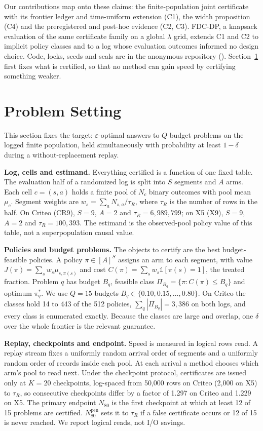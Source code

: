 \documentclass[sigconf,anonymous,review]{acmart}
\newcommand{\eps}{\varepsilon}
\newcommand{\Npen}{N_{80}^{\text{pen}}}
\begin{document}
\noindent Our contributions map onto these claims: the finite-population joint certificate with its frontier ledger and time-uniform extension (C1), the width proposition (C4) and the preregistered and post-hoc evidence (C2, C3). FDC-DP, a knapsack evaluation of the same certificate family on a global $\lambda$ grid, extends C1 and C2 to implicit policy classes and to a log whose evaluation outcomes informed no design choice. Code, locks, seeds and seals are in the anonymous repository (\anonrepo). Section~\ref{sec:setting} first fixes what is certified, so that no method can gain speed by certifying something weaker.

\section{Problem Setting}\label{sec:setting}

This section fixes the target: $\eps$-optimal answers to $Q$ budget problems on the logged finite population, held simultaneously with probability at least $1-\delta$ during a without-replacement replay.

\textbf{Log, cells and estimand.} Everything certified is a function of one fixed table. The evaluation half of a randomized log is split into $S$ segments and $A$ arms. Each cell $c = (s,a)$ holds a finite pool of $N_c$ binary outcomes with pool mean $\mu_c$. Segment weights are $w_s = \sum_a N_{s,a}/\tau_R$, where $\tau_R$ is the number of rows in the half. On Criteo (CR9), $S = 9$, $A = 2$ and $\tau_R = 6{,}989{,}799$; on X5 (X9), $S = 9$, $A = 2$ and $\tau_R = 100{,}393$. The estimand is the observed-pool policy value of this table, not a superpopulation causal value.

\textbf{Policies and budget problems.} The objects to certify are the best budget-feasible policies. A policy $\pi \in [A]^S$ assigns an arm to each segment, with value $J(\pi) = \sum_s w_s \mu_{s,\pi(s)}$ and cost $C(\pi) = \sum_s w_s \mathbb{1}[\pi(s) = 1]$, the treated fraction. Problem $q$ has budget $B_q$, feasible class $\Pi_{B_q} = \{\pi : C(\pi) \le B_q\}$ and optimum $\pi^*_q$. We use $Q = 15$ budgets $B_q \in \{0.10, 0.15, \dots, 0.80\}$. On Criteo the classes hold 14 to 443 of the 512 policies, $\sum_q |\Pi_{B_q}| = 3{,}386$ on both logs, and every class is enumerated exactly. Because the classes are large and overlap, one $\delta$ over the whole frontier is the relevant guarantee.

\textbf{Replay, checkpoints and endpoint.} Speed is measured in logical rows read. A replay stream fixes a uniformly random arrival order of segments and a uniformly random order of records inside each pool. At each arrival a method chooses which arm's pool to read next. Under the checkpoint protocol, certificates are issued only at $K = 20$ checkpoints, log-spaced from 50,000 rows on Criteo (2,000 on X5) to $\tau_R$, so consecutive checkpoints differ by a factor of 1.297 on Criteo and 1.229 on X5. The primary endpoint $N_{80}$ is the first checkpoint at which at least 12 of 15 problems are certified. $\Npen$ sets it to $\tau_R$ if a false certificate occurs or 12 of 15 is never reached. We report logical reads, not I/O savings.
\end{document}
